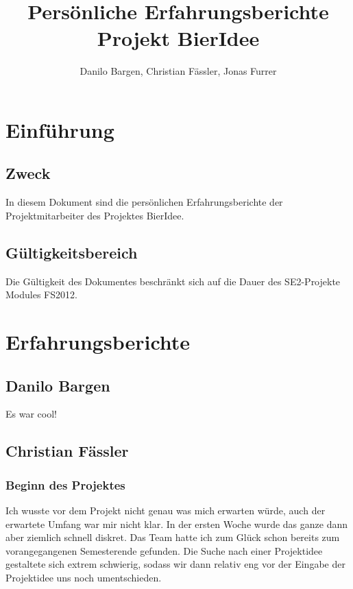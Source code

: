 \documentclass[10pt,a4paper]{scrartcl}
\author{Danilo Bargen, Christian Fässler, Jonas Furrer}
\title{Persönliche Erfahrungsberichte\\ Projekt BierIdee}
\begin{document}
\begin{titlepage}
	\maketitle
	\vspace{120mm}
	\thispagestyle{empty} %
\end{titlepage}

\tableofcontents
\newpage

\section{Einführung}

\subsection{Zweck}
In diesem Dokument sind die persönlichen Erfahrungsberichte der Projektmitarbeiter des Projektes BierIdee.

\subsection{Gültigkeitsbereich}
Die Gültigkeit des Dokumentes beschränkt sich auf die Dauer des SE2-Projekte Modules FS2012.

\newpage
\section{Erfahrungsberichte}
\subsection{Danilo Bargen}
Es war cool!


\newpage
\subsection{Christian Fässler}
\subsubsection*{Beginn des Projektes}
Ich wusste vor dem Projekt nicht genau was mich erwarten würde, auch der erwartete Umfang war mir nicht klar. In der ersten Woche wurde das ganze dann aber ziemlich schnell diskret. Das Team hatte ich zum Glück schon bereits zum vorangegangenen Semesterende gefunden. Die Suche nach einer Projektidee gestaltete sich extrem schwierig, sodass wir dann relativ eng vor der Eingabe der Projektidee uns noch umentschieden.
\end{document}
